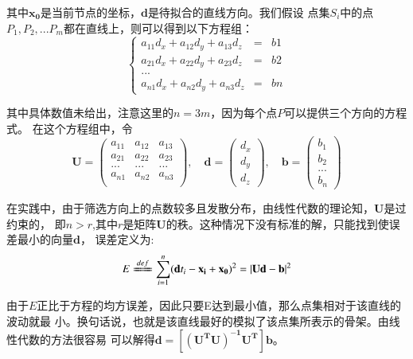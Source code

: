 其中$\mathbf{x_0}$是当前节点的坐标，$\mathbf{d}$是待拟合的直线方向。我们假设
点集$S_i$中的点$P_1,P_2,...P_m$都在直线上，则可以得到以下方程组：\\

\begin{equation} \label{eq:line}
	\left\{ 
		\begin{array}{lll}
			a_{11}d_x+a_{12}d_y+a_{13}d_z & = & b1\\
			a_{21}d_x+a_{22}d_y+a_{23}d_z & = & b2\\
			... & & \\
			a_{n1}d_x+a_{n2}d_y+a_{n3}d_z & = & bn
		\end{array}
	\right.
\end{equation}

其中具体数值未给出，注意这里的$n=3m$，因为每个点$P$可以提供三个方向的方程式。
在这个方程组中，令\\
\begin{displaymath}
	\mathbf{U}=
\left(
\begin{array}{ccc}
	a_{11} & a_{12} & a_{13}\\
	a_{21} & a_{22} & a_{23}\\
	... & ... & ...\\
	a_{n1} & a_{n2} & a_{n3}\\
\end{array}
\right)
,\quad
\mathbf{d}=
\left(
\begin{array}{c}
	d_x\\
	d_y\\
	d_z
\end{array}
\right)
,\quad
\mathbf{b}=
\left(
\begin{array}{c}
	b_1\\
	b_2\\
	...\\
	b_n
\end{array}
\right)
\end{displaymath}


在实践中，由于筛选方向上的点数较多且发散分布，由线性代数的理论知，$\mathbf{U}$是过约束的，
即$n>r$,其中$r$是矩阵$\mathbf{U}$的秩。这种情况下没有标准的解，只能找到使误差最小的向量$\mathbf{d}$，
误差定义为:\\
\begin{equation}
	E\xlongequal{def} \sum_{i=1}^n(\mathbf{d}t_i - \mathbf{x_i} + \mathbf{x_0})^2=|\mathbf{Ud}-\mathbf{b}|^2
\end{equation}

由于$E$正比于方程的均方误差，因此只要E达到最小值，那么点集相对于该直线的波动就最
小。换句话说，也就是该直线最好的模拟了该点集所表示的骨架。由线性代数的方法很容易
可以解得$\mathbf{d}=\mathbf{[(U^TU)^{-1}U^T]b}$。

